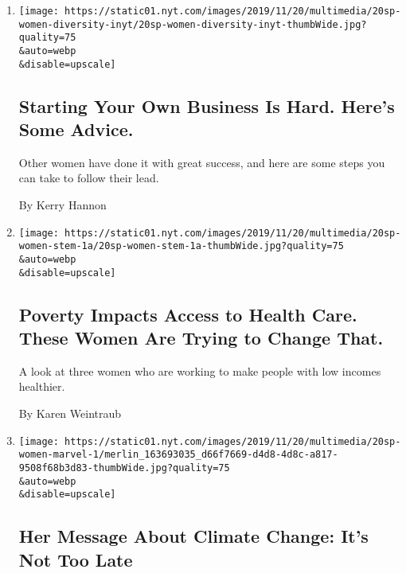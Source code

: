 \begin{enumerate}
\def\labelenumi{\arabic{enumi}.}
\item
  \href{/2019/11/19/business/women-entrepreneurs-advice.html}{}

  \texttt{[image: https://static01.nyt.com/images/2019/11/20/multimedia/20sp-women-diversity-inyt/20sp-women-diversity-inyt-thumbWide.jpg?quality=75\\\&auto=webp\\\&disable=upscale]}

  \hypertarget{starting-your-own-business-is-hard-heres-some-advice}{%
  \subsection{Starting Your Own Business Is Hard. Here's Some
  Advice.}\label{starting-your-own-business-is-hard-heres-some-advice}}

  Other women have done it with great success, and here are some steps
  you can take to follow their lead.

  By Kerry Hannon
\item
  \href{/2019/11/19/health/women-health-care-access.html}{}

  \texttt{[image: https://static01.nyt.com/images/2019/11/20/multimedia/20sp-women-stem-1a/20sp-women-stem-1a-thumbWide.jpg?quality=75\\\&auto=webp\\\&disable=upscale]}

  \hypertarget{poverty-impacts-access-to-health-care-these-women-are-trying-to-change-that}{%
  \subsection{Poverty Impacts Access to Health Care. These Women Are
  Trying to Change
  That.}\label{poverty-impacts-access-to-health-care-these-women-are-trying-to-change-that}}

  A look at three women who are working to make people with low incomes
  healthier.

  By Karen Weintraub
\item
  \href{/2019/11/19/climate/kate-marvel-environment.html}{}

  \texttt{[image: https://static01.nyt.com/images/2019/11/20/multimedia/20sp-women-marvel-1/merlin\_163693035\_d66f7669-d4d8-4d8c-a817-9508f68b3d83-thumbWide.jpg?quality=75\\\&auto=webp\\\&disable=upscale]}

  \hypertarget{her-message-about-climate-change-its-not-too-late}{%
  \subsection{Her Message About Climate Change: It's Not Too
  Late}\label{her-message-about-climate-change-its-not-too-late}}


\end{enumerate}
